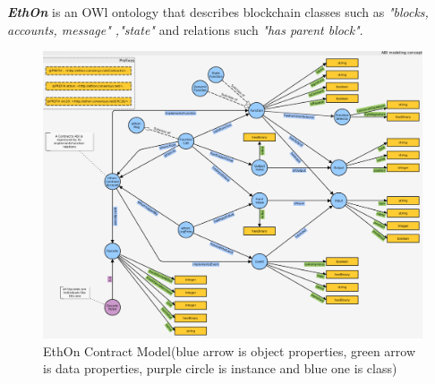 \textbf{\textit{EthOn}} is an OWl ontology that describes blockchain classes such as \textit{"blocks, accounts, message" ,"state"} and relations such \textit{"has parent block"}\cite{Rashid}. 
\begin{center}
	
	\begin{figure}[htb!]
		
		\begin{minipage}{0.50\linewidth}
			\centering
			\includegraphics[width=1.80\textwidth]{images/chap2_EthOnContract.png}
		\end{minipage}
		\caption[EthOn classes]{EthOn Contract Model(blue arrow is object properties, green arrow is data properties, purple circle is instance and blue one is class)\cite{Rashid}}
		
	\end{figure}
	
	\begin{figure}[htb!]
		

\end{figure}
\end{center}
